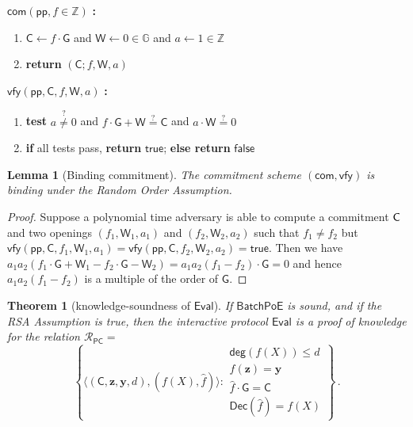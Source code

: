 \documentclass[10pt,conference]{IEEEtran}
\theoremstyle{Definition}
\newtheorem{theorem}{Theorem}
\newtheorem{lemma}{Lemma}
\begin{document}
\begin{mdframed}
$\mathsf{com}(\mathsf{pp}, f \in \mathbb{Z})$ \textbf{:}
\begin{enumerate}[nolistsep]
\item $\mathsf{C} \gets f \cdot \mathsf{G}$ and $\mathsf{W} \gets 0 \in \mathbb{G}$ and $a \gets 1 \in \mathbb{Z}$
\item \textbf{return} $(\mathsf{C}; f, \mathsf{W}, a)$
\end{enumerate}
\vspace{0.125cm}
$\mathsf{vfy}(\mathsf{pp}, \mathsf{C}, f, \mathsf{W}, a)$ \textbf{:}
\begin{enumerate}[nolistsep]
\item \textbf{test} $a \stackrel{?}{\neq} 0$ and $f \cdot \mathsf{G} + \mathsf{W} \stackrel{?}{=} \mathsf{C}$ and $a \cdot \mathsf{W} \stackrel{?}{=} 0$
\item \textbf{if} all tests pass, \textbf{return} $\mathsf{true}$; \textbf{else return} $\mathsf{false}$
\end{enumerate}
\end{mdframed}

\begin{lemma}[Binding commitment]
\label{lem:aug-com-binding}
The commitment scheme $(\mathsf{com}, \mathsf{vfy})$ is binding under the Random Order Assumption. 
\end{lemma}
\begin{proof}
Suppose a polynomial time adversary is able to compute a commitment $\mathsf{C}$ and two openings $(f_1, \mathsf{W}_1, a_1)$ and $(f_2, \mathsf{W}_2, a_2)$ such that $f_1 \neq f_2$ but $\mathsf{vfy}(\mathsf{pp}, \mathsf{C}, f_1, \mathsf{W}_1, a_1) = \mathsf{vfy}(\mathsf{pp}, \mathsf{C}, f_2, \mathsf{W}_2, a_2) = \mathsf{true}$. Then we have $a_1 a_2 (f_1 \cdot \mathsf{G} + \mathsf{W}_1 - f_2 \cdot \mathsf{G} - \mathsf{W}_2) = a_1 a_2 (f_1 - f_2) \cdot \mathsf{G} = 0$ and hence $a_1 a_2 (f_1 - f_2)$ is a multiple of the order of $\mathsf{G}$.
\end{proof}

\begin{theorem}[knowledge-soundness of $\mathsf{Eval}$]
If $\mathsf{BatchPoE}$ is sound, and if the RSA Assumption is true, then the interactive protocol $\mathsf{Eval}$ is a proof of knowledge for the relation $\mathcal{R}_{\mathsf{PC}} =$
$$ \left\{ \langle (\mathsf{C}, \mathbf{z}, \mathbf{y}, d), (f(X), \hat{f})\rangle : \begin{array}{l}
\mathsf{deg}(f(X)) \leq d \\
f(\mathbf{z}) = \mathbf{y} \\
\hat{f} \cdot \mathsf{G} = \mathsf{C} \\
\mathsf{Dec}(\hat{f}) = f(X)
\end{array} \right\} \, .$$
\end{theorem}
\end{document}
